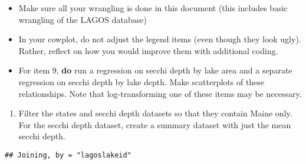 \documentclass[]{article}
\newenvironment{Shaded}{\begin{snugshade}}{\end{snugshade}}
\newcommand{\KeywordTok}[1]{\textcolor[rgb]{0.13,0.29,0.53}{\textbf{#1}}}
\newcommand{\NormalTok}[1]{#1}
\newcommand{\OperatorTok}[1]{\textcolor[rgb]{0.81,0.36,0.00}{\textbf{#1}}}
\newcommand{\StringTok}[1]{\textcolor[rgb]{0.31,0.60,0.02}{#1}}
\providecommand{\tightlist}{%
  \setlength{\itemsep}{0pt}\setlength{\parskip}{0pt}}
\begin{document}
\begin{itemize}
\tightlist
\item
  Make sure all your wrangling is done in this document (this includes
  basic wrangling of the LAGOS database)
\item
  In your cowplot, do not adjust the legend items (even though they look
  ugly). Rather, reflect on how you would improve them with additional
  coding.
\item
  For item 9, \textbf{do} run a regression on secchi depth by lake area
  and a separate regression on secchi depth by lake depth. Make
  scatterplots of these relationships. Note that log-transforming one of
  these items may be necessary.
\end{itemize}

\begin{enumerate}
\def\labelenumi{\arabic{enumi}.}
\setcounter{enumi}{4}
\tightlist
\item
  Filter the states and secchi depth datasets so that they contain Maine
  only. For the secchi depth dataset, create a summary dataset with just
  the mean secchi depth.
\end{enumerate}

\begin{Shaded}
\end{Shaded}

\begin{verbatim}
## Joining, by = "lagoslakeid"
\end{verbatim}
\end{document}
